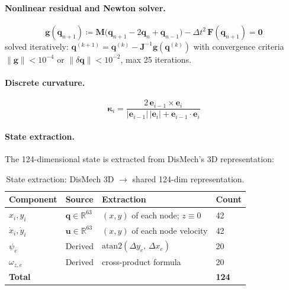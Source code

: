 \documentclass[11pt]{article}
\begin{document}
\paragraph{Nonlinear residual and Newton solver.}
\begin{equation}
  \mathbf{g}(\mathbf{q}_{n+1})
    \coloneqq \mathbf{M}\bigl(\mathbf{q}_{n+1} - 2\mathbf{q}_n + \mathbf{q}_{n-1}\bigr)
    - \Delta t^2\,\mathbf{F}(\mathbf{q}_{n+1})
    = \mathbf{0}
  \label{eq:dismech-residual}
\end{equation}
solved iteratively: $\mathbf{q}^{(k+1)} = \mathbf{q}^{(k)} - \mathbf{J}^{-1}\mathbf{g}(\mathbf{q}^{(k)})$ with convergence criteria $\|\mathbf{g}\| < 10^{-4}$ or $\|\delta\mathbf{q}\| < 10^{-2}$, max 25 iterations.

\paragraph{Discrete curvature.}
\begin{equation}
  \boldsymbol{\kappa}_i
    = \frac{2\,\mathbf{e}_{i-1} \times \mathbf{e}_i}
           {|\mathbf{e}_{i-1}|\,|\mathbf{e}_i| + \mathbf{e}_{i-1} \cdot \mathbf{e}_i}
  \label{eq:dismech-curvature-binormal}
\end{equation}

\paragraph{State extraction.}
The 124-dimensional state is extracted from DisMech's 3D representation:

\begin{table}[H]
  \centering
  \small
  \renewcommand{\arraystretch}{1.3}
  \caption{State extraction: DisMech 3D $\to$ shared 124-dim representation.}
  \label{tab:dismech-state-extraction}
  \begin{tabular}{llll}
    \toprule
    Component & Source & Extraction & Count \\
    \midrule
    $x_i, y_i$          & $\mathbf{q} \in \mathbb{R}^{63}$ & $(x, y)$ of each node; $z \equiv 0$ & 42 \\
    $\dot{x}_i, \dot{y}_i$ & $\mathbf{u} \in \mathbb{R}^{63}$ & $(x, y)$ of each node velocity & 42 \\
    $\psi_e$             & Derived & $\text{atan2}(\Delta y_e,\, \Delta x_e)$ & 20 \\
    $\omega_{z,e}$       & Derived & cross-product formula & 20 \\
    \midrule
    \multicolumn{3}{l}{\textbf{Total}} & \textbf{124} \\
    \bottomrule
  \end{tabular}
\end{table}
\end{document}
